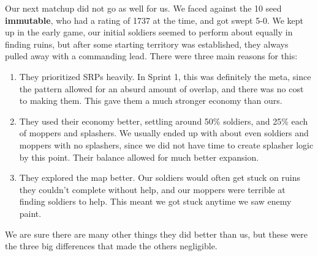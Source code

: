 Our next matchup did not go as well for us. We faced against the 10 seed \textbf{immutable}, who had a rating of 1737 at the time, and got swept 5-0. We kept up in the early game, our initial soldiers seemed to perform about equally in finding ruins, but after some starting territory was established, they always pulled away with a commanding lead. There were three main reasons for this:
\begin{enumerate}
  \item They prioritized SRPs heavily. In Sprint 1, this was definitely the meta, since the pattern allowed for an absurd amount of overlap, and there was no cost to making them. This gave them a much stronger economy than ours.
  \item They used their economy better, settling around 50\% soldiers, and 25\% each of moppers and splashers. We usually ended up with about even soldiers and moppers with no splashers, since we did not have time to create splasher logic by this point. Their balance allowed for much better expansion.
  \item They explored the map better. Our soldiers would often get stuck on ruins they couldn't complete without help, and our moppers were terrible at finding soldiers to help. This meant we got stuck anytime we saw enemy paint.
\end{enumerate}
We are sure there are many other things they did better than us, but these were the three big differences that made the others negligible.